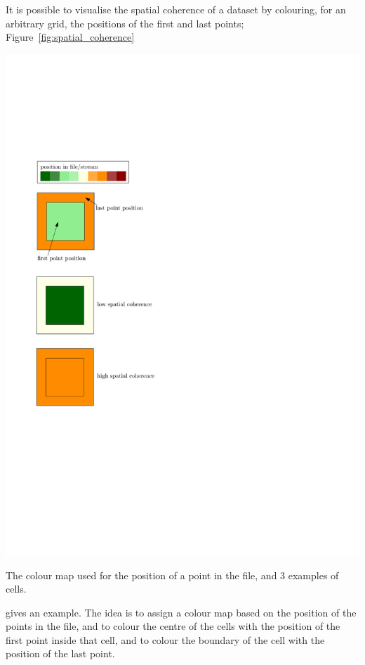 It is possible to visualise the spatial coherence of a dataset by colouring, for an arbitrary grid, the positions of the first and last points; Figure~\ref{fig:spatial_coherence}
\begin{marginfigure}
  \centering
  \includegraphics[width=0.95\linewidth]{figs/spatial_coherence}
  \caption{The colour map used for the position of a point in the file, and 3 examples of cells.}%
\label{fig:spatial_coherence}
\end{marginfigure}
gives an example.
The idea is to assign a colour map based on the position of the points in the file, and to colour the centre of the cells with the position of the first point inside that cell, and to colour the boundary of the cell with the position of the last point.

